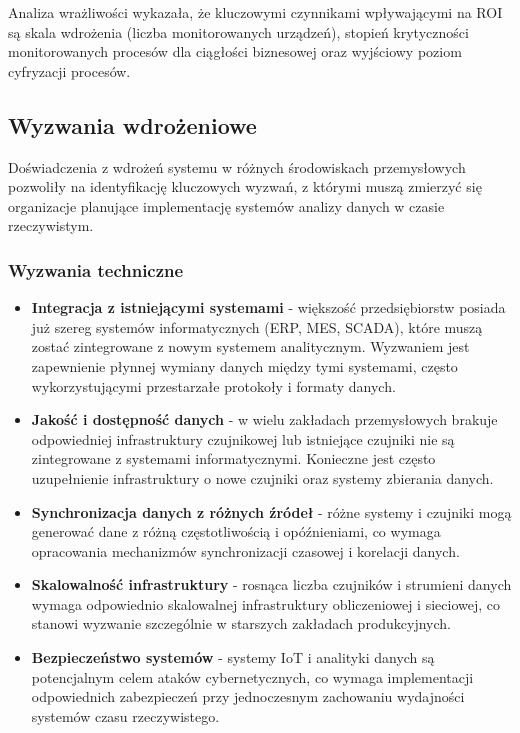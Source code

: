 Analiza wrażliwości wykazała, że kluczowymi czynnikami wpływającymi na ROI są skala wdrożenia (liczba monitorowanych urządzeń), stopień krytyczności monitorowanych procesów dla ciągłości biznesowej oraz wyjściowy poziom cyfryzacji procesów.

\subsection{Wyzwania wdrożeniowe}
\label{subsec:wyzwania_wdrozeniowe}

Doświadczenia z wdrożeń systemu w różnych środowiskach przemysłowych pozwoliły na identyfikację kluczowych wyzwań, z którymi muszą zmierzyć się organizacje planujące implementację systemów analizy danych w czasie rzeczywistym.

\subsubsection{Wyzwania techniczne}
\label{subsubsec:wyzwania_techniczne}

\begin{itemize}
    \item \textbf{Integracja z istniejącymi systemami} - większość przedsiębiorstw posiada już szereg systemów informatycznych (ERP, MES, SCADA), które muszą zostać zintegrowane z nowym systemem analitycznym. Wyzwaniem jest zapewnienie płynnej wymiany danych między tymi systemami, często wykorzystującymi przestarzałe protokoły i formaty danych.
    \item \textbf{Jakość i dostępność danych} - w wielu zakładach przemysłowych brakuje odpowiedniej infrastruktury czujnikowej lub istniejące czujniki nie są zintegrowane z systemami informatycznymi. Konieczne jest często uzupełnienie infrastruktury o nowe czujniki oraz systemy zbierania danych.
    \item \textbf{Synchronizacja danych z różnych źródeł} - różne systemy i czujniki mogą generować dane z różną częstotliwością i opóźnieniami, co wymaga opracowania mechanizmów synchronizacji czasowej i korelacji danych.
    \item \textbf{Skalowalność infrastruktury} - rosnąca liczba czujników i strumieni danych wymaga odpowiednio skalowalnej infrastruktury obliczeniowej i sieciowej, co stanowi wyzwanie szczególnie w starszych zakładach produkcyjnych.
    \item \textbf{Bezpieczeństwo systemów} - systemy IoT i analityki danych są potencjalnym celem ataków cybernetycznych, co wymaga implementacji odpowiednich zabezpieczeń przy jednoczesnym zachowaniu wydajności systemów czasu rzeczywistego.
\end{itemize}

